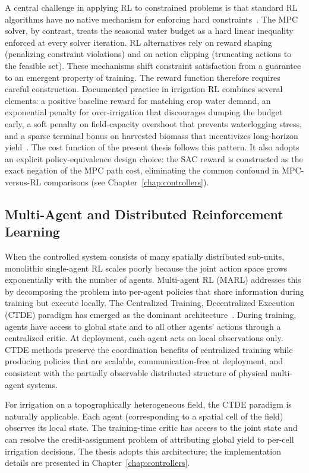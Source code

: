 A central challenge in applying RL to constrained problems is that
standard RL algorithms have no native mechanism for enforcing hard
constraints~\cite{Bayar2025}. The MPC solver, by contrast, treats the
seasonal water budget as a hard linear inequality enforced at every
solver iteration. RL alternatives rely on reward shaping (penalizing
constraint violations) and on action clipping (truncating actions to
the feasible set). These mechanisms shift constraint satisfaction
from a guarantee to an emergent property of training. The reward
function therefore requires careful construction. Documented practice
in irrigation RL combines several elements: a positive baseline
reward for matching crop water demand, an exponential penalty for
over-irrigation that discourages dumping the budget early, a soft
penalty on field-capacity overshoot that prevents waterlogging stress,
and a sparse terminal bonus on harvested biomass that incentivizes
long-horizon yield~\cite{Bayar2025}. The cost function of the
present thesis follows this pattern. It also adopts an explicit
policy-equivalence design choice: the SAC reward is constructed as
the exact negation of the MPC path cost, eliminating the common
confound in MPC-versus-RL comparisons (see Chapter~\ref{chap:controllers}).

\subsection{Multi-Agent and Distributed Reinforcement Learning}
\label{ssec:lit-marl}

When the controlled system consists of many spatially distributed
sub-units, monolithic single-agent RL scales poorly because the
joint action space grows exponentially with the number of agents.
Multi-agent RL (MARL) addresses this by decomposing the problem into
per-agent policies that share information during training but execute
locally. The Centralized Training, Decentralized Execution (CTDE)
paradigm has emerged as the dominant
architecture~\cite{amato2024ctde}. During training, agents have
access to global state and to all other agents' actions through a
centralized critic. At deployment, each agent acts on local
observations only. CTDE methods preserve the coordination benefits
of centralized training while producing policies that are scalable,
communication-free at deployment, and consistent with the partially
observable distributed structure of physical multi-agent systems.

For irrigation on a topographically heterogeneous field, the CTDE
paradigm is naturally applicable. Each agent (corresponding to a
spatial cell of the field) observes its local state. The
training-time critic has access to the joint state and can resolve
the credit-assignment problem of attributing global yield to per-cell
irrigation decisions. The thesis adopts this architecture; the
implementation details are presented in Chapter~\ref{chap:controllers}.

